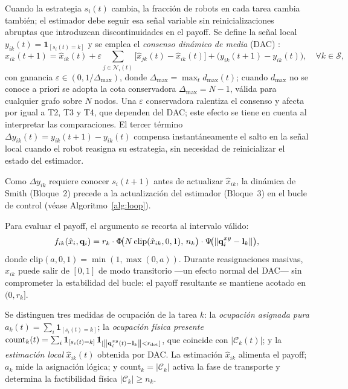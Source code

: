 Cuando la estrategia $s_i(t)$ cambia, la fracción de robots en cada tarea cambia
también; el estimador debe seguir esa señal variable sin reinicializaciones
abruptas que introduzcan discontinuidades en el payoff.
Se define la señal local $y_{ik}(t) = \mathbf{1}_{[s_i(t)=k]}$ y se emplea el
\emph{consenso dinámico de media} (DAC) \citep{kia2019tutorial}:
\begin{equation}
  \hat{x}_{ik}(t+1) = \hat{x}_{ik}(t)
    + \varepsilon \!\sum_{j \in \mathcal{N}_i(t)}\!\bigl[\hat{x}_{jk}(t) - \hat{x}_{ik}(t)\bigr]
    + \bigl(y_{ik}(t+1) - y_{ik}(t)\bigr),
  \quad \forall k \in \mathcal{S},
  \label{eq:consenso}
\end{equation}
con ganancia $\varepsilon \in (0, 1/\Delta_{\max})$, donde
$\Delta_{\max} = \max_t d_{\max}(t)$; cuando $d_{\max}$ no se conoce a priori se
adopta la cota conservadora $\Delta_{\max} = N-1$, válida para cualquier grafo sobre
$N$ nodos. Una $\varepsilon$ conservadora ralentiza el consenso y afecta por igual a
T2, T3 y T4, que dependen del DAC; este efecto se tiene en cuenta al interpretar las
comparaciones. El tercer término
$\Delta y_{ik}(t) = y_{ik}(t+1) - y_{ik}(t)$ compensa instantáneamente el salto
en la señal local cuando el robot reasigna su estrategia, sin necesidad de
reinicializar el estado del estimador.

Como $\Delta y_{ik}$ requiere conocer $s_i(t+1)$ antes de actualizar
$\hat{x}_{ik}$, la dinámica de Smith (Bloque~2) precede a la actualización
del estimador (Bloque~3) en el bucle de control (véase Algoritmo~\ref{alg:loop}).

Para evaluar el payoff, el argumento se recorta al intervalo válido:
\begin{equation}
  f_{ik}(\hat{x}_i, \mathbf{q}_i)
    = r_k \cdot \Phi\!\bigl(N\,\mathrm{clip}(\hat{x}_{ik},0,1),\,n_k\bigr)
      \cdot \Psi\!\bigl(\left\|\mathbf{q}_i^{xy} - \mathbf{l}_k\right\|\bigr),
  \label{eq:payoff_clip}
\end{equation}
donde $\mathrm{clip}(a,0,1) = \min(1,\max(0,a))$.
Durante reasignaciones masivas, $\hat{x}_{ik}$ puede salir de $[0,1]$ de modo
transitorio —un efecto normal del DAC— sin comprometer la estabilidad del bucle: el
payoff resultante se mantiene acotado en $(0, r_k]$.

Se distinguen tres medidas de ocupación de la tarea $k$: la \emph{ocupación
asignada pura} $a_k(t) = \sum_i \mathbf{1}_{[s_i(t)=k]}$; la \emph{ocupación física
presente} $\mathrm{count}_k(t) = \sum_i \mathbf{1}_{[s_i(t)=k]}\,
\mathbf{1}_{[\left\|\mathbf{q}_i^{xy}(t)-\mathbf{l}_k\right\|<r_{\mathrm{det}}]}$, que coincide
con $|\mathcal{C}_k(t)|$; y la \emph{estimación local} $\hat{x}_{ik}(t)$ obtenida por
DAC. La estimación $\hat{x}_{ik}$ alimenta el payoff; $a_k$ mide la asignación lógica;
y $\mathrm{count}_k = |\mathcal{C}_k|$ activa la fase de transporte y determina la
factibilidad física $|\mathcal{C}_k| \geq n_k$.

